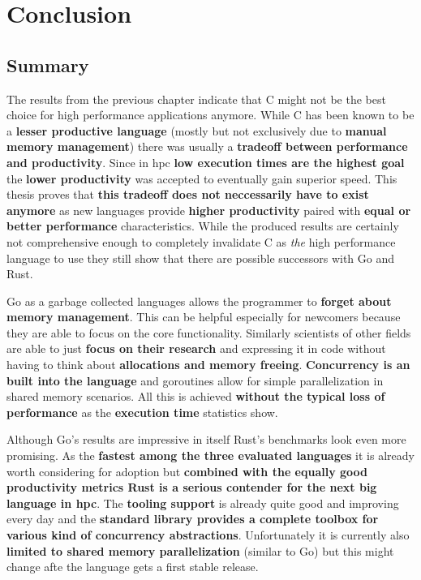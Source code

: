 \chapter{Conclusion}
\label{ch:Conclusion}


\section{Summary}
\label{sec:Conclusion::Summary}

The results from the previous chapter indicate that C might not be the best choice for high performance applications anymore. While C has been known to be a \textbf{lesser productive language} (mostly but not exclusively due to \textbf{manual memory management}) there was usually a \textbf{tradeoff between performance and productivity}. Since in \gls{hpc} \textbf{low execution times are the highest goal} the \textbf{lower productivity} was accepted to eventually gain superior speed. This thesis proves that \textbf{this tradeoff does not neccessarily have to exist anymore} as new languages provide \textbf{higher productivity} paired with \textbf{equal or better performance} characteristics. While the produced results are certainly not comprehensive enough to completely invalidate C as \textit{the} high performance language to use they still show that there are possible successors with Go and Rust.

Go as a garbage collected languages allows the programmer to \textbf{forget about memory management}. This can be helpful especially for newcomers because they are able to focus on the core functionality. Similarly scientists of other fields are able to just \textbf{focus on their research} and expressing it in code without having to think about \textbf{allocations and memory freeing}. \textbf{Concurrency is an built into the language} and \glspl{goroutine} allow for simple parallelization in shared memory scenarios. All this is achieved \textbf{without the typical loss of performance} as the \textbf{execution time} statistics show.

Although Go's results are impressive in itself Rust's benchmarks look even more promising. As the \textbf{fastest among the three evaluated languages} it is already worth considering for adoption but \textbf{combined with the equally good productivity metrics Rust is a serious contender for the next big language in \acrlong{hpc}}. The \textbf{tooling support} is already quite good and improving every day and the \textbf{standard library provides a complete toolbox for various kind of concurrency abstractions}. Unfortunately it is currently also \textbf{limited to shared memory parallelization} (similar to Go) but this might change afte the language gets a first stable release.


